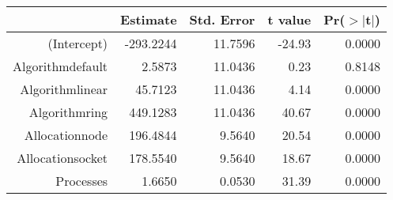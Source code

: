\begin{tabular}{rrrrr}
  \hline
 & Estimate & Std. Error & t value & Pr($>$$|$t$|$) \\ 
  \hline
(Intercept) & -293.2244 & 11.7596 & -24.93 & 0.0000 \\ 
  Algorithmdefault & 2.5873 & 11.0436 & 0.23 & 0.8148 \\ 
  Algorithmlinear & 45.7123 & 11.0436 & 4.14 & 0.0000 \\ 
  Algorithmring & 449.1283 & 11.0436 & 40.67 & 0.0000 \\ 
  Allocationnode & 196.4844 & 9.5640 & 20.54 & 0.0000 \\ 
  Allocationsocket & 178.5540 & 9.5640 & 18.67 & 0.0000 \\ 
  Processes & 1.6650 & 0.0530 & 31.39 & 0.0000 \\ 
   \hline
\end{tabular}
